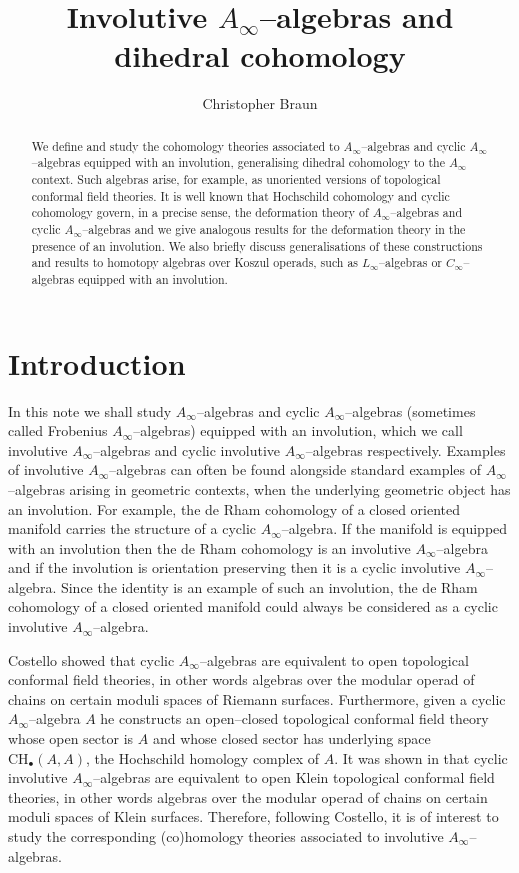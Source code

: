 \documentclass[british]{amsart}
\title{Involutive \texorpdfstring{$A_\infty$--}{A-infinity }algebras and dihedral cohomology}
\author{Christopher Braun}
\theoremstyle{plain}
\theoremstyle{definition}
{
\newaliascnt{{definition}}{theorem}\newtheorem{{definition}}[{definition}]{{Definition}}\aliascntresetthe{{definition}}\expandafterautorefname\endcsname{{Definition}}}
{
\newaliascnt{{remark}}{theorem}\newtheorem{{remark}}[{remark}]{{Remark}}\aliascntresetthe{{remark}}\expandafterautorefname\endcsname{{Remark}}}
{
\newaliascnt{{example}}{theorem}\newtheorem{{example}}[{example}]{{Example}}\aliascntresetthe{{example}}\expandafterautorefname\endcsname{{Example}}}
{
\newaliascnt{{examples}}{theorem}\newtheorem{{examples}}[{examples}]{{Examples}}\aliascntresetthe{{examples}}\expandafterautorefname\endcsname{{Examples}}}
{
\newaliascnt{{notation}}{theorem}\newtheorem{{notation}}[{notation}]{{Notation}}\aliascntresetthe{{notation}}\expandafterautorefname\endcsname{{Notation}}}
{
\newaliascnt{{convention}}{theorem}\newtheorem{{convention}}[{convention}]{{Convention}}\aliascntresetthe{{convention}}\expandafterautorefname\endcsname{{Convention}}}
\numberwithin{equation}{section}
\numberwithin{figure}{section}
\begin{document}
\begin{abstract}
We define and study the cohomology theories associated to $A_\infty$--algebras and cyclic $A_\infty$--algebras equipped with an involution, generalising dihedral cohomology to the $A_\infty$ context. Such algebras arise, for example, as unoriented versions of topological conformal field theories. It is well known that Hochschild cohomology and cyclic cohomology govern, in a precise sense, the deformation theory of $A_\infty$--algebras and cyclic $A_\infty$--algebras and we give analogous results for the deformation theory in the presence of an involution. We also briefly discuss generalisations of these constructions and results to homotopy algebras over Koszul operads, such as $L_\infty$--algebras or $C_\infty$--algebras equipped with an involution.
\end{abstract}

\maketitle 
\tableofcontents

\section{Introduction}
In this note we shall study $A_\infty$--algebras and cyclic $A_\infty$--algebras (sometimes called Frobenius $A_\infty$--algebras) equipped with an involution, which we call involutive $A_\infty$--algebras and cyclic involutive $A_\infty$--algebras respectively. Examples of involutive $A_\infty$--algebras can often be found alongside standard examples of $A_\infty$--algebras arising in geometric contexts, when the underlying geometric object has an involution. For example, the de Rham cohomology of a closed oriented manifold carries the structure of a cyclic $A_\infty$--algebra. If the manifold is equipped with an involution then the de Rham cohomology is an involutive $A_\infty$--algebra and if the involution is orientation preserving then it is a cyclic involutive $A_\infty$--algebra. Since the identity is an example of such an involution, the de Rham cohomology of a closed oriented manifold could always be considered as a cyclic involutive $A_\infty$--algebra.

Costello \cite{costello2007:ribbondecomp,costello2007:tcftcalabiyau} showed that cyclic $A_\infty$--algebras are equivalent to open topological conformal field theories, in other words algebras over the modular operad of chains on certain moduli spaces of Riemann surfaces. Furthermore, given a cyclic $A_\infty$--algebra $A$ he constructs an open--closed topological conformal field theory whose open sector is $A$ and whose closed sector has underlying space ${\mathrm{CH}}_\bullet(A,A)$, the Hochschild homology complex of $A$. It was shown in \cite{braun:moduliklein} that cyclic involutive $A_\infty$--algebras are equivalent to open Klein topological conformal field theories, in other words algebras over the modular operad of chains on certain moduli spaces of Klein surfaces. Therefore, following Costello, it is of interest to study the corresponding (co)homology theories associated to involutive $A_\infty$--algebras.
\end{document}
